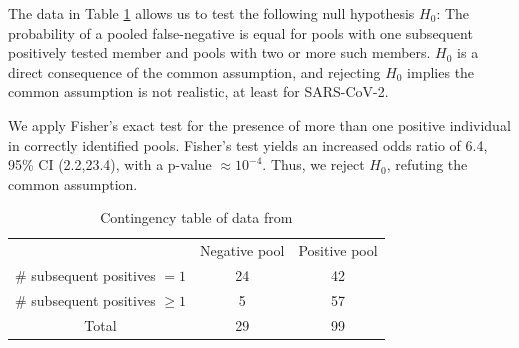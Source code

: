 \documentclass{article}
\begin{document}
The data in Table \ref{table} allows us to test the following null
hypothesis $H_0$: The probability of a pooled false-negative is equal
for pools with one subsequent positively tested member and pools with
two or more such members. $H_0$ is a direct consequence of the common
assumption, and rejecting $H_0$ implies the common assumption is not
realistic, at least for SARS-CoV-2.

We apply Fisher's exact test for the presence of more than one
positive individual in correctly identified pools. Fisher's test
yields an increased odds ratio of 6.4, 95\% CI (2.2,23.4), with a
p-value $\approx 10^{-4}$. Thus, we reject $H_0$, refuting the common
assumption.

\begin{table}[h]
\centering
\begin{tabular}{ c c c }
                                & Negative pool  & Positive pool \\%
\# subsequent positives $=1$    & 24             & 42            \\%
\# subsequent positives $\geq1$ & 5              & 57            \\%
 Total                          & 29             & 99            \\%
\end{tabular}
\caption{Contingency table of data from \cite{Salazar}}\label{table}
\end{table}
\end{document}
